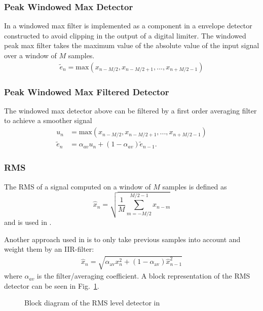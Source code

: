 \documentclass[../main2.tex]{subfiles}
\providecommand{\rootdir}{..}
\begin{document}
\subsubsection{Peak Windowed Max Detector}
In \cite{hamalainen2002smoothing} a windowed max filter is implemented as a component in a envelope detector constructed to avoid clipping in the output of a digital limiter. The windowed peak max filter takes the maximum value of the absolute value of the input signal over a window of $M$ samples.
\begin{align}
\tilde{e}_n = \text{max}(x_{n-M/2},x_{n-M/2+1},..., x_{n+M/2-1})
\end{align}
\subsubsection{Peak Windowed Max Filtered Detector}
The windowed max detector above can be filtered by a first order averaging filter to achieve a smoother signal
\begin{align}
u_n &= \text{max}(x_{n-M/2},x_{n-M/2+1},..., x_{n+M/2-1}) \\
\tilde{e}_n &= \alpha_{av} u_n + (1-\alpha_{av})\tilde{e}_{n-1}.
\end{align}

\subsubsection{RMS}
The RMS of a signal computed on a window of $M$ samples is defined as
\begin{equation}
\hat{x}_n = \sqrt{ \frac{1}{M} \sum_{m=-M/2}^{M/2-1} x_{n-m}}
\end{equation}
and is used in \cite{reiss2010rev}\cite{bosi1991low}.

Another approach used in \cite{mcnally1984dynamic} is to only take previous samples into account and weight them by an IIR-filter:
\begin{align*}
\hat{x}_n = \sqrt{\alpha_{\text{av}} x_{n}^2+ (1-\alpha_{\text{av}}) \hat{x}_{n-1}^2}
\end{align*}
where $\alpha_{av}$ is the filter/averaging coefficient. A block representation of the RMS detector can be seen in Fig.~\ref{fig:block_mcnally_theory_rms}.%
\begin{figure}[h]
\centerline{}
\caption{Block diagram of the RMS level detector in \cite{mcnally1984dynamic}}
\label{fig:block_mcnally_theory_rms}
\end{figure}
\end{document}
